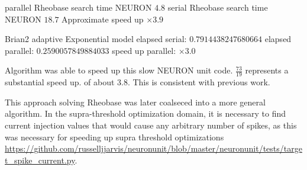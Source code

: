 parallel Rheobase search time NEURON  $4.8$
serial Rheobase search time NEURON  $18.7$
Approximate speed up $\times 3.9$

Brian2 adaptive Exponential model   
elapsed serial:  $0.7914438247680664$
elapsed parallel: $ 0.2590057849884033$
speed up parallel:   $\times 3.0$

Algorithm was able to speed up this slow NEURON unit code. $ \frac{73}{19} $ represents a substantial speed up. of about 3.8. This is consistent with previous work.

This approach solving Rheobase was later coalseced into a more general algorithm. In the supra-threshold optimization domain, it is necessary to find current injection values that would cause any arbitrary number of spikes, as this was necessary for speeding up supra threshold optimizations \url{https://github.com/russelljjarvis/neuronunit/blob/master/neuronunit/tests/target_spike_current.py}.

 